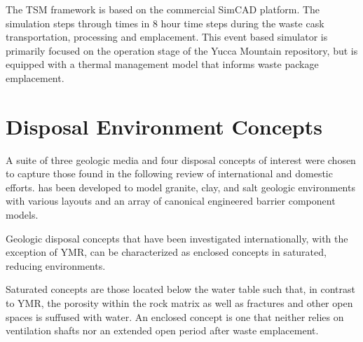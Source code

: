 The TSM framework is based on the commercial SimCAD platform. The simulation 
steps through times in 8 hour time steps during the waste cask transportation, 
processing and emplacement. This event based simulator is primarily focused on 
the operation stage of the Yucca Mountain repository, but is equipped with a 
thermal management model that informs waste package emplacement.

\section{Disposal Environment Concepts}





A suite of three geologic media and four disposal concepts of interest were 
chosen to capture those found in the following review of 
international and domestic efforts. \Cyder has been developed to model granite, 
clay, and salt geologic environments with various layouts and an array of 
canonical engineered barrier component models.  

Geologic disposal concepts that have been investigated internationally, with the 
exception of \gls{YMR}, can be characterized as enclosed concepts in saturated, 
reducing environments. 

Saturated concepts are those located below the water table such that, in contrast to 
\gls{YMR}, the porosity within the rock matrix as well as fractures 
and other open spaces is suffused with water. An enclosed concept is one that 
neither relies on ventilation shafts nor an extended open period after waste 
emplacement.

